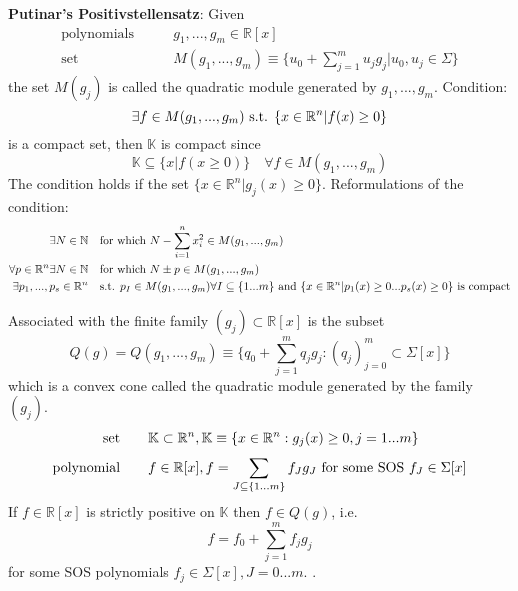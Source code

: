 \textbf{Putinar's Positivstellensatz}: Given
\begin{align}
\text{polynomials} \qquad & g_1,...,g_m\in\mathbb{R}[x]\\
\text{set} \qquad & M(g_1,...,g_m)\equiv\{u_0+\sum\limits_{j=1}^{m}u_jg_j|u_0,u_j\in\Sigma\}
\end{align}
the set $M(g_j)$ is called the quadratic module generated by $g_1,...,g_m$. Condition:
\begin{equation}
\exists f\in M(g_1,...,g_m) \textup{ s.t. } \{x\in \mathbb{R}^n|f(x)\geq 0 \}
\end{equation}
is a compact set, then $\mathbb{K}$ is compact since
\begin{equation}
\mathbb{K}\subseteq\{x|f(x\geq 0 )\} \quad \forall f\in M(g_1,...,g_m)
\end{equation}
The condition holds if the set $\{x\in\mathbb{R}^n|g_j(x)\geq 0 \}$. Reformulations of the condition:
\begin{align}
\exists N\in \mathbb{N} \quad & \textup{for which } N-\sum\limits_{i=1}^{n}x_i^2\in M(g_1,...,g_m)\\
\forall p\in \mathbb{R}^n \exists N\in \mathbb{N} \quad & \textup{for which } N\pm p\in M(g_1,...,g_m)\\
\exists p_1,...,p_s\in\mathbb{R}^n \quad & \textup{s.t. } p_I\in M(g_1,...,g_m) \forall I\subseteq\{1...m\} \textup{ and }\{x\in\mathbb{R}^n|p_1(x)\geq 0 ... p_s(x)\geq 0 \} \textup{ is compact}
\end{align}
\citep{bib:sos_putinar_laurent}

Associated with the finite family $(g_j)\subset\mathbb{R}[x]$ is the subset
\begin{equation}
Q(g)=Q(g_1,...,g_m)\equiv \{q_0+\sum\limits_{j=1}^{m}q_jg_j: (q_j)_{j=0}^m \subset \Sigma[x] \}
\end{equation}
which is a convex cone called the quadratic module generated by the family $(g_j)$.
\begin{align}
\text{set} \qquad & \mathbb{K}\subset\mathbb{R}^n, \mathbb{K}\equiv\{x\in \mathbb{R}^n : g_j(x)\geq 0, j=1...m \} \\
\text{polynomial} \qquad & f\in \mathbb{R}[x], f=\sum\limits_{J\subseteq \{1...m\}}^{}f_Jg_J \textup{ for some SOS } f_J\in\Sigma[x]
\end{align}
If $f\in\mathbb{R}[x]$ is strictly positive on $\mathbb{K}$ then $f\in Q(g)$, i.e.
\begin{equation}
f = f_0 + \sum\limits_{j=1}^{m}f_jg_j
\end{equation}
for some SOS polynomials $f_j\in\Sigma[x], J=0...m$. \citep{bib:sos_putainar_lasserre}.

